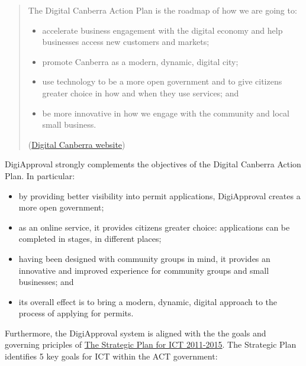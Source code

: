 \documentclass[12pt,a4paper,twosided]{article}
\begin{document}
\begin{framed}
\begin{quote}
The Digital Canberra Action Plan is the roadmap of how we are going to:

\begin{itemize}

\item
  accelerate business engagement with the digital economy and help
  businesses access new customers and markets;
\item
  promote Canberra as a modern, dynamic, digital city;
\item
  use technology to be a more open government and to give citizens
  greater choice in how and when they use services; and
\item
  be more innovative in how we engage with the community and local small
  business.
\end{itemize}

(\href{http://www.cmd.act.gov.au/policystrategic/digitalcanberra}{Digital
Canberra website})
\end{quote}
\end{framed}

DigiApproval strongly complements the objectives of the Digital Canberra
Action Plan. In particular:

\begin{itemize}

\item
  by providing better visibility into permit applications, DigiApproval
  creates a more open government;
\item
  as an online service, it provides citizens greater choice:
  applications can be completed in stages, in different places;
\item
  having been designed with community groups in mind, it provides an
  innovative and improved experience for community groups and small
  businesses; and
\item
  its overall effect is to bring a modern, dynamic, digital approach to
  the process of applying for permits.
\end{itemize}

Furthermore, the DigiApproval system is aligned with the the goals and
governing priciples of
\href{http://www.cmd.act.gov.au/__data/assets/pdf_file/0011/247826/The_Strategic_Plan_for_ICT_2011-15.pdf}{The
Strategic Plan for ICT 2011-2015}. The Strategic Plan identifies 5 key
goals for ICT within the ACT government:
\end{document}
